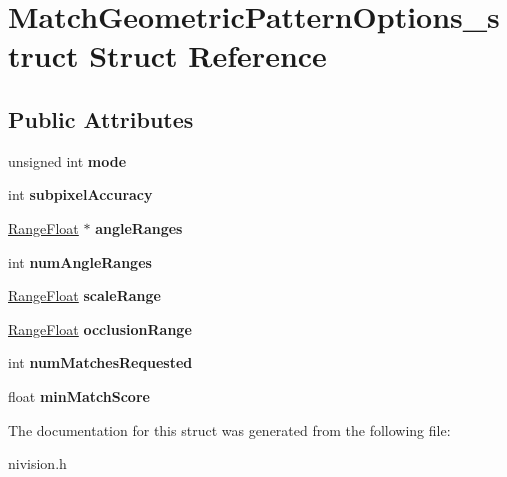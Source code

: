 \hypertarget{structMatchGeometricPatternOptions__struct}{\section{\-Match\-Geometric\-Pattern\-Options\-\_\-struct \-Struct \-Reference}
\label{structMatchGeometricPatternOptions__struct}
}
\subsection*{\-Public \-Attributes}
\begin{DoxyCompactItemize}
\item 
\hypertarget{structMatchGeometricPatternOptions__struct_a6280e73966043d63d2db9a51d927fbbe}{unsigned int {\bfseries mode}}\label{structMatchGeometricPatternOptions__struct_a6280e73966043d63d2db9a51d927fbbe}

\item 
\hypertarget{structMatchGeometricPatternOptions__struct_a456598efd9e15e3d7ec8fcf76ee3457e}{int {\bfseries subpixel\-Accuracy}}\label{structMatchGeometricPatternOptions__struct_a456598efd9e15e3d7ec8fcf76ee3457e}

\item 
\hypertarget{structMatchGeometricPatternOptions__struct_ab93ab5bd708b2a1444a4840ab736fcc2}{\hyperlink{structRangeFloat__struct}{\-Range\-Float} $\ast$ {\bfseries angle\-Ranges}}\label{structMatchGeometricPatternOptions__struct_ab93ab5bd708b2a1444a4840ab736fcc2}

\item 
\hypertarget{structMatchGeometricPatternOptions__struct_a7e4ba240ee32d9224e6c54c4f63d2cea}{int {\bfseries num\-Angle\-Ranges}}\label{structMatchGeometricPatternOptions__struct_a7e4ba240ee32d9224e6c54c4f63d2cea}

\item 
\hypertarget{structMatchGeometricPatternOptions__struct_a21a909990685cd1340726b88b93e4cfe}{\hyperlink{structRangeFloat__struct}{\-Range\-Float} {\bfseries scale\-Range}}\label{structMatchGeometricPatternOptions__struct_a21a909990685cd1340726b88b93e4cfe}

\item 
\hypertarget{structMatchGeometricPatternOptions__struct_a168ed50b5552267d140d8bb26da2ea3f}{\hyperlink{structRangeFloat__struct}{\-Range\-Float} {\bfseries occlusion\-Range}}\label{structMatchGeometricPatternOptions__struct_a168ed50b5552267d140d8bb26da2ea3f}

\item 
\hypertarget{structMatchGeometricPatternOptions__struct_a6e34184af01091516567464962fa055c}{int {\bfseries num\-Matches\-Requested}}\label{structMatchGeometricPatternOptions__struct_a6e34184af01091516567464962fa055c}

\item 
\hypertarget{structMatchGeometricPatternOptions__struct_a188106b7772a9e11e76fef0b3a254eb0}{float {\bfseries min\-Match\-Score}}\label{structMatchGeometricPatternOptions__struct_a188106b7772a9e11e76fef0b3a254eb0}

\end{DoxyCompactItemize}


\-The documentation for this struct was generated from the following file\-:\begin{DoxyCompactItemize}
\item 
nivision.\-h\end{DoxyCompactItemize}
